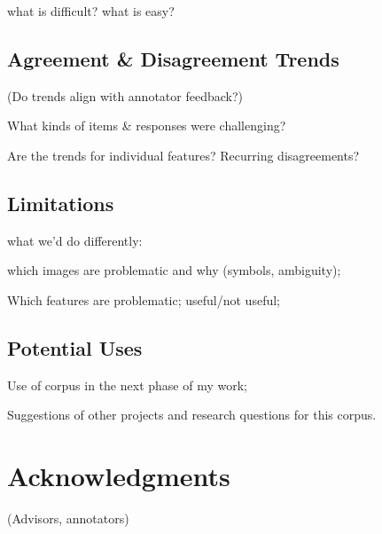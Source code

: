 \documentclass[11pt,a4paper]{article}
\begin{document}
what is difficult? what is easy?

\subsection{Agreement \& Disagreement Trends}
(Do trends align with annotator feedback?)

What kinds of items \& responses were challenging?

Are the trends for individual features? Recurring disagreements?


\subsection{Limitations}
what we'd do differently:

which images are problematic and why (symbols, ambiguity); 

Which features are problematic; useful/not useful;

\subsection{Potential Uses}
Use of corpus in the next phase of my work;

Suggestions of other projects and research questions for this corpus.

\section*{Acknowledgments}

(Advisors, annotators)


\end{document}
